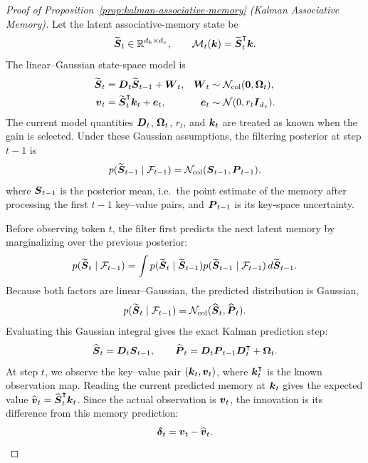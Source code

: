 \documentclass{article} %
\begin{document}
\begin{proof}[Proof of Proposition~\ref{prop:kalman-associative-memory} (Kalman Associative Memory)]

Let the latent associative-memory state be
\[
  \widetilde{\boldsymbol{S}}_t \in \mathbb{R}^{d_k\times d_v},
  \qquad
  \mathcal{M}_t(\boldsymbol{k})=\widetilde{\boldsymbol{S}}_t^{\intercal}\boldsymbol{k}.
\]
The linear--Gaussian state-space model is
\begin{align}
  \widetilde{\boldsymbol{S}}_t
  &= \boldsymbol{D}_t\widetilde{\boldsymbol{S}}_{t-1}+\boldsymbol{W}_t,
  &
  \boldsymbol{W}_t&\sim\mathcal N_{\mathrm{col}}(\boldsymbol{0},\boldsymbol{\Omega}_t), \\
  \boldsymbol{v}_t
  &= \widetilde{\boldsymbol{S}}_t^{\intercal}\boldsymbol{k}_t+\boldsymbol{e}_t,
  &
  \boldsymbol{e}_t&\sim\mathcal{N}(0,r_t\boldsymbol{I}_{d_v}).
\end{align}
The current model quantities $\boldsymbol{D}_t$, $\boldsymbol{\Omega}_t$, $r_t$, and $\boldsymbol{k}_t$ are treated as
known when the gain is selected.
Under these Gaussian assumptions, the filtering posterior at step $t-1$ is
\begin{equation}
  p(\widetilde{\boldsymbol{S}}_{t-1}\mid \mathcal F_{t-1})
  =
  \mathcal N_{\mathrm{col}}(\boldsymbol{S}_{t-1},\boldsymbol{P}_{t-1}),
  \label{eq:previous-filtering-posterior}
\end{equation}
where $\boldsymbol{S}_{t-1}$ is the posterior mean, i.e.\ the point estimate of the memory after
processing the first $t-1$ key--value pairs, and $\boldsymbol{P}_{t-1}$ is its key-space uncertainty.

Before observing token $t$, the filter first predicts the next latent memory by marginalizing
over the previous posterior:
\begin{equation}
  p(\widetilde{\boldsymbol{S}}_t\mid \mathcal F_{t-1})
  =
  \int
  p(\widetilde{\boldsymbol{S}}_t\mid \widetilde{\boldsymbol{S}}_{t-1})
  p(\widetilde{\boldsymbol{S}}_{t-1}\mid \mathcal F_{t-1})
  \,d\widetilde{\boldsymbol{S}}_{t-1} .
  \label{eq:prediction-integral}
\end{equation}
Because both factors are linear--Gaussian, the predicted distribution is Gaussian,
\begin{equation}
  p(\widetilde{\boldsymbol{S}}_t\mid \mathcal F_{t-1})
  =
  \mathcal N_{\mathrm{col}}(\widehat{\boldsymbol{S}}_t,\widehat{\boldsymbol{P}}_t).
  \label{eq:predicted-prior}
\end{equation}
Evaluating this Gaussian integral gives the exact Kalman prediction step:
\begin{equation}
  \widehat{\boldsymbol{S}}_t=\boldsymbol{D}_t\boldsymbol{S}_{t-1},
  \qquad
  \widehat{\boldsymbol{P}}_t
  =
  \boldsymbol{D}_t\boldsymbol{P}_{t-1}\boldsymbol{D}_t^{\intercal}+\boldsymbol{\Omega}_t.
  \label{eq:kam-predict}
\end{equation}
At step $t$, we observe the key--value pair $(\boldsymbol{k}_t,\boldsymbol{v}_t)$, where
$\boldsymbol{k}_t^{\intercal}$ is the known observation map.
Reading the current predicted memory at $\boldsymbol{k}_t$ gives the expected value
$\widehat{\boldsymbol{v}}_t=\widehat{\boldsymbol{S}}_t^{\intercal}\boldsymbol{k}_t$. Since the actual observation is
$\boldsymbol{v}_t$, the innovation is its difference from this memory prediction:
\begin{equation}
  \boldsymbol{\delta}_t=\boldsymbol{v}_t-\widehat{\boldsymbol{v}}_t.
  \label{eq:kam-innovation}
\end{equation}


\end{proof}
\end{document}
